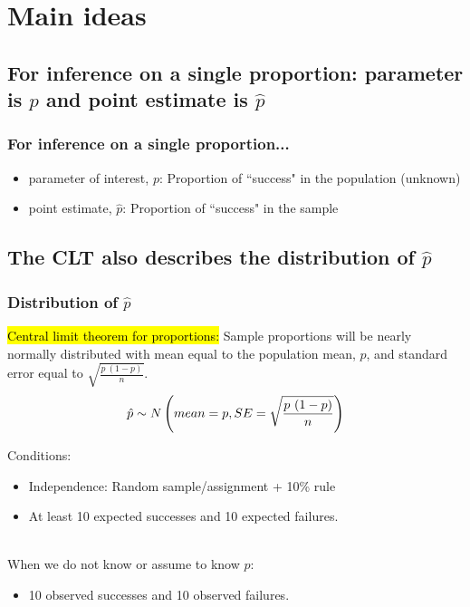 \documentclass[slidestop,compress,mathserif,12pt,t,professionalfonts,xcolor=table]{beamer}
\begin{document}

\section{Main ideas}


\subsection{For inference on a single proportion: parameter is $p$ and point estimate is $\hat{p}$}
\label{mi1}


\begin{frame}
\frametitle{For inference on a single proportion...}

\begin{itemize}

\item parameter of interest, $p$: Proportion of ``success" in the population (unknown)

\item point estimate, $\hat{p}$: Proportion of ``success" in the sample

\end{itemize}

\end{frame}


\subsection{The CLT also describes the distribution of $\hat{p}$}
\label{mi2}


\begin{frame}
\frametitle{Distribution of $\hat{p}$}

\hl{Central limit theorem for proportions:} Sample proportions will be nearly normally distributed with mean equal to the population mean, $p$, and standard error equal to $\sqrt{\frac{p~(1-p)}{n}}$.
\[ \hat{p} \sim N \left(  mean = p, SE = \sqrt{\frac{p~(1-p)}{n}}  \right) \]

Conditions:
\begin{itemize}
\item Independence: Random sample/assignment + 10\% rule
\item At least 10 expected successes and 10 expected failures.
\end{itemize}

\pause 

\hfill \\

When we do not know or assume to know $p$:
\begin{itemize}
\item 10 observed successes and 10 observed failures.
\end{itemize}

\note{

}

\end{frame}
\end{document}
